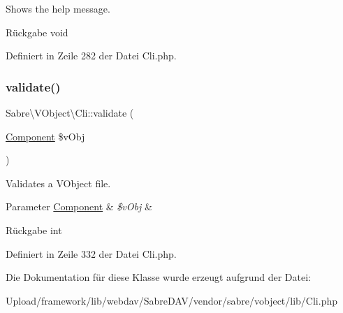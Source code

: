 Shows the help message.

\begin{DoxyReturn}{Rückgabe}
void 
\end{DoxyReturn}


Definiert in Zeile 282 der Datei Cli.\+php.

\mbox{\label{class_sabre_1_1_v_object_1_1_cli_a9c9cc797f2f58327b0c84455631a95a7}} 
\subsubsection{\texorpdfstring{validate()}{validate()}}
{\footnotesize\ttfamily Sabre\textbackslash{}\+V\+Object\textbackslash{}\+Cli\+::validate (\begin{DoxyParamCaption}\item[{\mbox{\hyperlink{class_sabre_1_1_v_object_1_1_component}{Component}}}]{\$v\+Obj }\end{DoxyParamCaption})\hspace{0.3cm}{\ttfamily [protected]}}

Validates a V\+Object file.


\begin{DoxyParams}[1]{Parameter}
\mbox{\hyperlink{class_sabre_1_1_v_object_1_1_component}{Component}} & {\em \$v\+Obj} & \\
\hline
\end{DoxyParams}
\begin{DoxyReturn}{Rückgabe}
int 
\end{DoxyReturn}


Definiert in Zeile 332 der Datei Cli.\+php.



Die Dokumentation für diese Klasse wurde erzeugt aufgrund der Datei\+:\begin{DoxyCompactItemize}
\item 
Upload/framework/lib/webdav/\+Sabre\+D\+A\+V/vendor/sabre/vobject/lib/Cli.\+php\end{DoxyCompactItemize}
